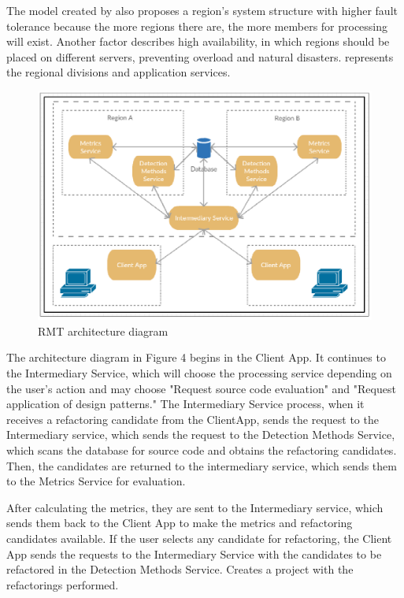 The model created by \textcite{beluzzo2018abordagem} also proposes a region's system structure with higher fault tolerance because the more regions there are, the more members for processing will exist. Another factor \textcite{beluzzo2018abordagem} describes high availability, in which regions should be placed on different servers, preventing overload and natural disasters.  represents the regional divisions and application services.

\begin{figure}[ht!]
\SetCaptionWidth{\textwidth}
\caption{RMT architecture diagram}
\label{fig-architecture}
\includegraphics[width =\textwidth]{Chapter-2/Figures/schema.png}
\end{figure}
\FloatBarrier

The architecture diagram in Figure 4 begins in the Client App. It continues to the Intermediary Service, which will choose the processing service depending on the user's action and may choose "Request source code evaluation" and "Request application of design patterns."
The Intermediary Service process, when it receives a refactoring candidate from the ClientApp, sends the request to the Intermediary service, which sends the request to the Detection Methods Service, which scans the database for source code and obtains the refactoring candidates. Then, the candidates are returned to the intermediary service, which sends them to the Metrics Service for evaluation. 

After calculating the metrics, they are sent to the Intermediary service, which sends them back to the Client App to make the metrics and refactoring candidates available. If the user selects any candidate for refactoring, the Client App sends the requests to the Intermediary Service with the candidates to be refactored in the Detection Methods Service. Creates a project with the refactorings performed.

